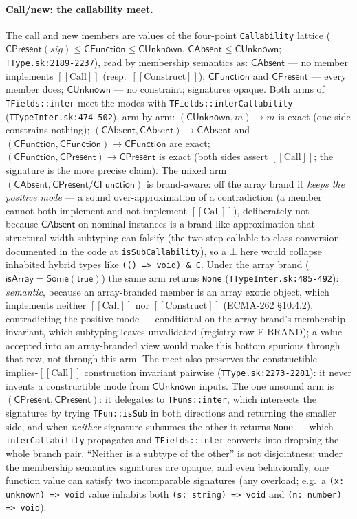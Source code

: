 \documentclass[11pt]{article}
\begin{document}
\paragraph{Call/new: the callability meet.}
The call and new members are values of the four-point
\texttt{Callability} lattice
($\mathsf{CPresent}(\mathit{sig}) \le \mathsf{CFunction} \le
\mathsf{CUnknown}$, $\mathsf{CAbsent} \le \mathsf{CUnknown}$;
\texttt{TType.sk:2189-2237}), read by membership semantics as:
$\mathsf{CAbsent}$ — no member implements $[[\mathrm{Call}]]$
(resp.\ $[[\mathrm{Construct}]]$); $\mathsf{CFunction}$ and
$\mathsf{CPresent}$ — every member does; $\mathsf{CUnknown}$ — no
constraint; signatures opaque. Both arms of \texttt{TFields::inter} meet
the modes with \texttt{TFields::interCallability}
(\texttt{TTypeInter.sk:474-502}), arm by arm:
$(\mathsf{CUnknown}, m) \to m$ is exact (one side constrains nothing);
$(\mathsf{CAbsent}, \mathsf{CAbsent}) \to \mathsf{CAbsent}$ and
$(\mathsf{CFunction}, \mathsf{CFunction}) \to \mathsf{CFunction}$ are
exact; $(\mathsf{CFunction}, \mathsf{CPresent}) \to \mathsf{CPresent}$
is exact (both sides assert $[[\mathrm{Call}]]$; the signature is the
more precise claim). The mixed arm
$(\mathsf{CAbsent}, \mathsf{CPresent}/\mathsf{CFunction})$ is
brand-aware: off the array brand it \emph{keeps the positive mode} — a
sound over-approximation of a contradiction (a member cannot both
implement and not implement $[[\mathrm{Call}]]$), deliberately not
$\bot$ because $\mathsf{CAbsent}$ on nominal instances is a brand-like
approximation that structural width subtyping can falsify (the two-step
callable-to-class conversion documented in the code at
\texttt{isSubCallability}), so a
$\bot$ here would collapse inhabited hybrid types like
\texttt{(() => void) \& C}. Under the array brand
($\mathsf{isArray} = \mathsf{Some(true)}$) the same arm returns
\texttt{None} (\texttt{TTypeInter.sk:485-492}): \emph{semantic},
because an array-branded member is an array exotic object, which
implements neither $[[\mathrm{Call}]]$ nor $[[\mathrm{Construct}]]$
(ECMA-262 \S10.4.2), contradicting the positive mode — conditional on
the array brand's membership invariant, which subtyping leaves
unvalidated (registry row F-BRAND); a value accepted into an
array-branded view would make this bottom spurious
through that row, not through this arm. The meet also preserves the
constructible-implies-$[[\mathrm{Call}]]$ construction invariant
pairwise (\texttt{TType.sk:2273-2281}): it never invents a
constructible mode from $\mathsf{CUnknown}$ inputs. The one unsound
arm is $(\mathsf{CPresent}, \mathsf{CPresent})$: it delegates to
\texttt{TFuns::inter}, which intersects the signatures by trying
\texttt{TFun::isSub} in both directions and returning the smaller side,
and when \emph{neither} signature subsumes the other it returns
\texttt{None} — which \texttt{interCallability} propagates and
\texttt{TFields::inter} converts into dropping the whole branch pair.
``Neither is a subtype of the other'' is not disjointness: under the
membership semantics signatures are opaque, and even behaviorally, one
function value can satisfy two incomparable signatures (any overload;
e.g.\ a \texttt{(x: unknown) => void} value inhabits both
\texttt{(s: string) => void} and \texttt{(n: number) => void}).
\end{document}
